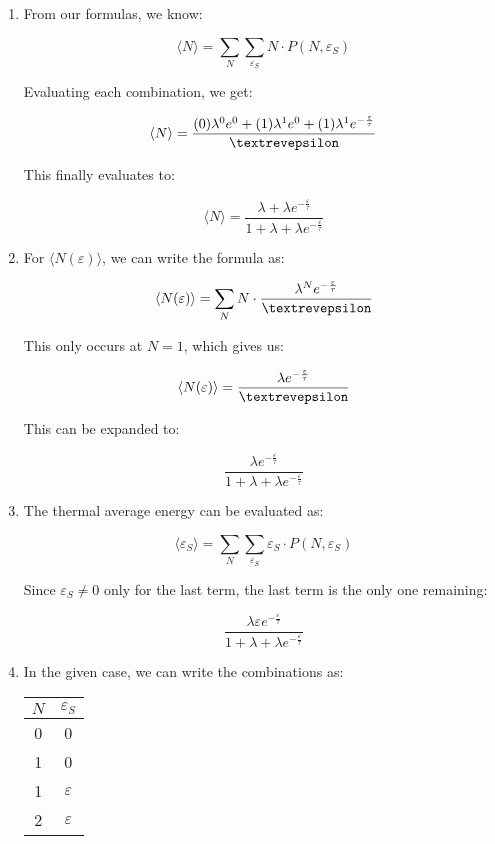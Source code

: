 \begin{enumerate}
\begin{enumerate}
      \item 

        From our formulas, we know:

        $$\langle N\rangle=\sum_N\sum_{\varepsilon_S}N\cdot P(N,\varepsilon_S)$$

        Evaluating each combination, we get:

        $$\langle N\rangle=\frac{(0)\lambda^0e^0+(1)\lambda^1e^0+(1)\lambda^1e^{-\frac{\varepsilon}{\tau}}}{\text{\textrevepsilon}}$$

        This finally evaluates to:

        $$\boxed{\langle N\rangle=\frac{\lambda+\lambda e^{-\frac{\varepsilon}{\tau}}}{1+\lambda+\lambda e^{-\frac{\varepsilon}{\tau}}}}$$

      \item 

        For $\langle N(\varepsilon)\rangle$, we can write the formula as:

        $$\langle N(\varepsilon)\rangle=\sum_N N\cdot\frac{\lambda^N e^{-\frac{\varepsilon}{\tau}}}{\text{\textrevepsilon}}$$

        This only occurs at $N=1$, which gives us:

        $$\langle N(\varepsilon)\rangle=\frac{\lambda e^{-\frac{\varepsilon}{\tau}}}{\text{\textrevepsilon}}$$

        This can be expanded to:

        $$\boxed{\frac{\lambda e^{-\frac{\varepsilon}{\tau}}}{1+\lambda+\lambda e^{-\frac{\varepsilon}{\tau}}}}$$

      \item 

        The thermal average energy can be evaluated as:

        $$\langle \varepsilon_S\rangle=\sum_N\sum_{\varepsilon_S}\varepsilon_S\cdot P(N,\varepsilon_S)$$

        Since $\varepsilon_S\neq0$ only for the last term, the last term is the only one remaining:

        $$\boxed{\frac{\lambda \varepsilon e^{-\frac{\varepsilon}{\tau}}}{1+\lambda+\lambda e^{-\frac{\varepsilon}{\tau}}}}$$

      \item 

        In the given case, we can write the combinations as:

        \begin{center}
          \begin{tabular}[H]{|c|c|}
            \hline
            $N$ & $\varepsilon_S$\\
            \hline
            0 & 0\\
            \hline
            1 & 0\\
            \hline
            1 & $\varepsilon$\\
            \hline
            2 & $\varepsilon$\\
            \hline
          \end{tabular}
        \end{center}


\end{enumerate}
\end{enumerate}
